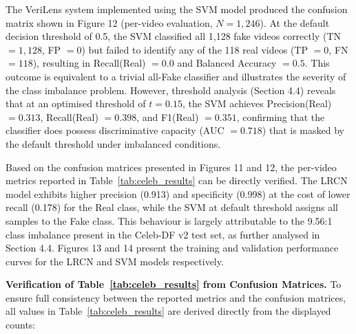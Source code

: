 The VeriLens system implemented using the SVM model produced the confusion matrix shown in Figure 12 (per-video evaluation, $N = 1{,}246$). At the default decision threshold of 0.5, the SVM classified all 1,128 fake videos correctly (TN $= 1{,}128$, FP $= 0$) but failed to identify any of the 118 real videos (TP $= 0$, FN $= 118$), resulting in Recall(Real) $= 0.0$ and Balanced Accuracy $= 0.5$. This outcome is equivalent to a trivial all-Fake classifier and illustrates the severity of the class imbalance problem. However, threshold analysis (Section 4.4) reveals that at an optimised threshold of $t = 0.15$, the SVM achieves Precision(Real) $= 0.313$, Recall(Real) $= 0.398$, and F1(Real) $= 0.351$, confirming that the classifier does possess discriminative capacity (AUC $= 0.718$) that is masked by the default threshold under imbalanced conditions.




Based on the confusion matrices presented in Figures 11 and 12, the per-video metrics reported in Table~\ref{tab:celeb_results} can be directly verified. The LRCN model exhibits higher precision (0.913) and specificity (0.998) at the cost of lower recall (0.178) for the Real class, while the SVM at default threshold assigns all samples to the Fake class. This behaviour is largely attributable to the 9.56:1 class imbalance present in the Celeb-DF v2 test set, as further analysed in Section 4.4. Figures 13 and 14 present the training and validation performance curves for the LRCN and SVM models respectively.

\vspace{3mm}

\noindent\textbf{Verification of Table~\ref{tab:celeb_results} from Confusion Matrices.} To ensure full consistency between the reported metrics and the confusion matrices, all values in Table~\ref{tab:celeb_results} are derived directly from the displayed counts:

